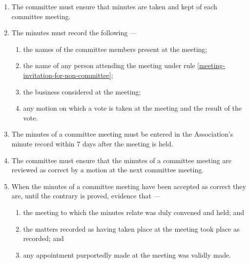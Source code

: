 \documentclass[../constitution.tex]{subfiles}
\begin{document}
\begin{enumerate}

\item The committee must ensure that minutes are taken and kept of each committee meeting.
\item The minutes must record the following ---

  \begin{enumerate}
  
  \item the names of the committee members present at the meeting;
  \item the name of any person attending the meeting under rule \ref{meeting-invitation-for-non-committee};
  \item the business considered at the meeting;
  \item any motion on which a vote is taken at the meeting and the result of the vote.
  \end{enumerate}
\item The minutes of a committee meeting must be entered in the Association's minute record within 7 days after the meeting is held. 
\item The committee must ensure that the minutes of a committee meeting are reviewed as correct by a motion at the next committee meeting. 
\item When the minutes of a committee meeting have been accepted as correct they are, until the contrary is proved, evidence that ---

  \begin{enumerate}
  
  \item the meeting to which the minutes relate was duly convened and held; and
  \item the matters recorded as having taken place at the meeting took place as recorded; and
  \item any appointment purportedly made at the meeting was validly made.
  \end{enumerate}
\end{enumerate}
\end{document}
